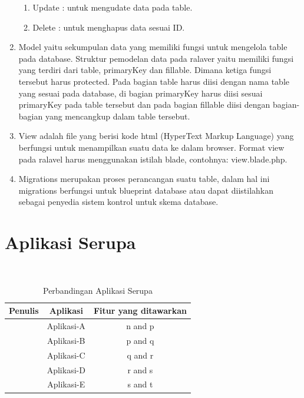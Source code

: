 \begin{enumerate}
\begin{enumerate}
\item Update \hspace{0.1cm}: untuk mengudate data pada table.

\item Delete \hspace{0.19cm}: untuk menghapus data sesuai ID.
\end{enumerate}

\item Model yaitu sekumpulan data yang memiliki fungsi untuk mengelola table pada database. Struktur pemodelan data pada ralaver yaitu memiliki fungsi yang terdiri dari table, primaryKey dan fillable. Dimana ketiga fungsi tersebut harus protected. Pada bagian table harus diisi dengan nama table yang sesuai pada database, di bagian primaryKey harus diisi sesuai primaryKey pada table tersebut dan pada bagian fillable diisi dengan bagian-bagian yang mencangkup dalam table tersebut.

\item View adalah file yang berisi kode html (HyperText Markup Language) yang berfungsi untuk menampilkan suatu data ke dalam browser. Format view pada ralavel harus menggunakan istilah blade, contohnya: view.blade.php.

\item Migrations merupakan proses perancangan suatu table, dalam hal ini migrations berfungsi untuk blueprint database atau dapat diistilahkan sebagai penyedia sistem kontrol untuk skema database. 

\end{enumerate}

\section{Aplikasi Serupa}



\blindtext \\

\begin{table}[h]
	\centering
	\caption{Perbandingan Aplikasi Serupa}
	\label{tab:1}
	\begin{tabular}{ c c c }
		\hline
		\textbf{Penulis} 		& \textbf{Aplikasi}  & \textbf{Fitur yang ditawarkan}\\ \hline \hline
		\cite{Narayana2010} 	& Aplikasi-A		& n and p \\ 
		\cite{Patel2016} 		& Aplikasi-B		& p and q \\ 
		\cite{Phadte2017} 		& Aplikasi-C		& q and r \\ 
		\cite{Rachmawanto2017} 	& Aplikasi-D		& r and s \\ 
		\cite{Reddy2016} 		& Aplikasi-E		& s and t \\ \hline
	\end{tabular}
\end{table}